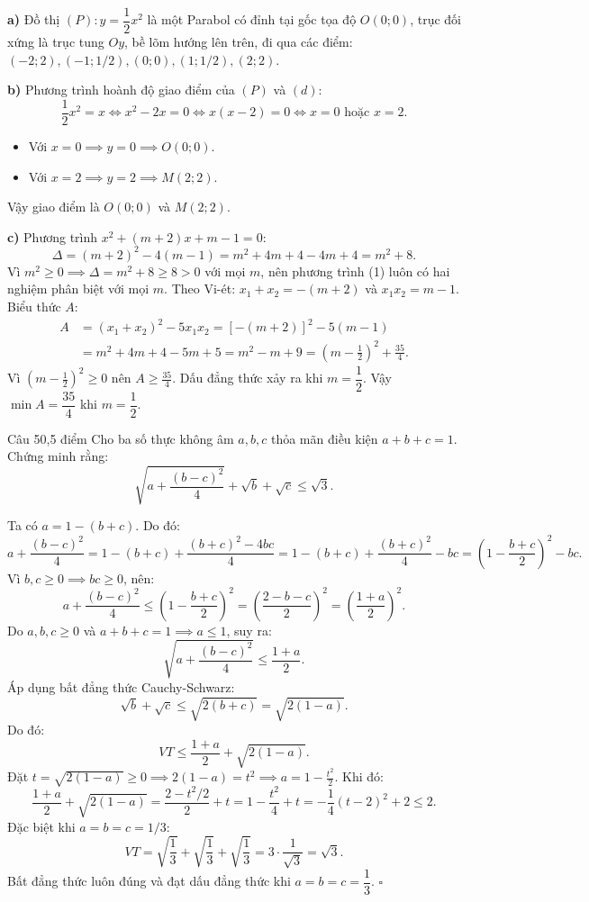 \begin{loi_giai_cau}
\textbf{a)} Đồ thị $(P)\colon y = \dfrac{1}{2}x^2$ là một Parabol có đỉnh tại gốc tọa độ $O(0; 0)$, trục đối xứng là trục tung $Oy$, bề lõm hướng lên trên, đi qua các điểm: $(-2; 2), (-1; 1/2), (0; 0), (1; 1/2), (2; 2)$.

\textbf{b)} Phương trình hoành độ giao điểm của $(P)$ và $(d)$:
\[\frac{1}{2}x^2 = x \iff x^2 - 2x = 0 \iff x(x-2) = 0 \iff x = 0\text{ hoặc }x = 2.\]
\begin{itemize}
\item Với $x = 0 \implies y = 0 \implies O(0; 0)$.
\item Với $x = 2 \implies y = 2 \implies M(2; 2)$.
\end{itemize}
Vậy giao điểm là $\boxed{O(0; 0)}$ và $\boxed{M(2; 2)}$.

\textbf{c)} Phương trình $x^2 + (m+2)x + m - 1 = 0$:
\[\Delta = (m+2)^2 - 4(m-1) = m^2 + 4m + 4 - 4m + 4 = m^2 + 8.\]
Vì $m^2 \ge 0 \implies \Delta = m^2 + 8 \ge 8 > 0$ với mọi $m$, nên phương trình (1) luôn có hai nghiệm phân biệt với mọi $m$.
Theo Vi-ét: $x_1+x_2 = -(m+2)$ và $x_1 x_2 = m-1$.
Biểu thức $A$:
\begin{align*}
A &= (x_1+x_2)^2 - 5x_1 x_2 = [-(m+2)]^2 - 5(m-1) \\
&= m^2 + 4m + 4 - 5m + 5 = m^2 - m + 9 = \left(m - \frac{1}{2}\right)^2 + \frac{35}{4}.
\end{align*}
Vì $\left(m - \frac{1}{2}\right)^2 \ge 0$ nên $A \ge \frac{35}{4}$.
Dấu đẳng thức xảy ra khi $\boxed{m = \dfrac{1}{2}}$.
Vậy $\min A = \dfrac{35}{4}$ khi $m = \dfrac{1}{2}$.
\end{loi_giai_cau}

\begin{de_cau}{Câu 5}{0,5 điểm}
Cho ba số thực không âm $a, b, c$ thỏa mãn điều kiện $a + b + c = 1$. Chứng minh rằng:
\[\sqrt{a + \dfrac{(b-c)^2}{4}} + \sqrt{b} + \sqrt{c} \le \sqrt{3}.\]
\end{de_cau}

\begin{loi_giai_cau}
Ta có $a = 1 - (b+c)$. Do đó:
\[a + \frac{(b-c)^2}{4} = 1 - (b+c) + \frac{(b+c)^2 - 4bc}{4} = 1 - (b+c) + \frac{(b+c)^2}{4} - bc = \left(1 - \frac{b+c}{2}\right)^2 - bc.\]
Vì $b, c \ge 0 \implies bc \ge 0$, nên:
\[a + \frac{(b-c)^2}{4} \le \left(1 - \frac{b+c}{2}\right)^2 = \left(\frac{2-b-c}{2}\right)^2 = \left(\frac{1+a}{2}\right)^2.\]
Do $a, b, c \ge 0$ và $a+b+c=1 \implies a \le 1$, suy ra:
\[\sqrt{a + \frac{(b-c)^2}{4}} \le \frac{1+a}{2}.\]
Áp dụng bất đẳng thức Cauchy-Schwarz:
\[\sqrt{b} + \sqrt{c} \le \sqrt{2(b+c)} = \sqrt{2(1-a)}.\]
Do đó:
\[VT \le \frac{1+a}{2} + \sqrt{2(1-a)}.\]
Đặt $t = \sqrt{2(1-a)} \ge 0 \implies 2(1-a) = t^2 \implies a = 1 - \frac{t^2}{2}$.
Khi đó:
\[\frac{1+a}{2} + \sqrt{2(1-a)} = \frac{2 - t^2/2}{2} + t = 1 - \frac{t^2}{4} + t = -\frac{1}{4}(t-2)^2 + 2 \le 2.\]
Đặc biệt khi $a = b = c = 1/3$:
\[VT = \sqrt{\frac{1}{3}} + \sqrt{\frac{1}{3}} + \sqrt{\frac{1}{3}} = 3 \cdot \frac{1}{\sqrt{3}} = \sqrt{3}.\]
Bất đẳng thức luôn đúng và đạt dấu đẳng thức khi $a = b = c = \dfrac{1}{3}$. $\square$
\end{loi_giai_cau}
